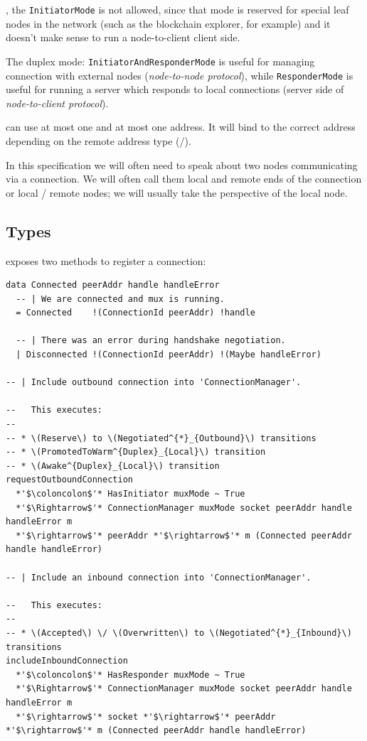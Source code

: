 \noindent, the \texttt{InitiatorMode} is not allowed, since that mode is reserved for
special leaf nodes in the network (such as the blockchain explorer, for example) and it doesn't make
sense to run a node-to-client client side.

The duplex mode: \texttt{InitiatorAndResponderMode} is useful for managing
connection with external nodes (\textit{node-to-node protocol}), while
\texttt{ResponderMode} is useful for running a server which responds to local
connections (server side of \textit{node-to-client protocol}).


\Connmngr{} can use at most one \ipvfour{} and at most one \ipvsix{}
address. It will bind to the correct address depending on the remote address
type (\ipvfour{}/\ipvsix{}).

In this specification we will often need to speak about two nodes communicating
via a \TCP{} connection.  We will often call them local and remote ends of the
connection or local \slash{} remote nodes; we will usually take the
perspective of the local node.


\subsection{Types} %

\Connmngr{} exposes two methods to register a connection:

\begin{lstlisting}
data Connected peerAddr handle handleError
  -- | We are connected and mux is running.
  = Connected    !(ConnectionId peerAddr) !handle

  -- | There was an error during handshake negotiation.
  | Disconnected !(ConnectionId peerAddr) !(Maybe handleError)

-- | Include outbound connection into 'ConnectionManager'.

--   This executes:
--
-- * \(Reserve\) to \(Negotiated^{*}_{Outbound}\) transitions
-- * \(PromotedToWarm^{Duplex}_{Local}\) transition
-- * \(Awake^{Duplex}_{Local}\) transition
requestOutboundConnection
  *'$\coloncolon$'* HasInitiator muxMode ~ True
  *'$\Rightarrow$'* ConnectionManager muxMode socket peerAddr handle handleError m
  *'$\rightarrow$'* peerAddr *'$\rightarrow$'* m (Connected peerAddr handle handleError)

-- | Include an inbound connection into 'ConnectionManager'.

--   This executes:
--
-- * \(Accepted\) \/ \(Overwritten\) to \(Negotiated^{*}_{Inbound}\) transitions
includeInboundConnection
  *'$\coloncolon$'* HasResponder muxMode ~ True
  *'$\Rightarrow$'* ConnectionManager muxMode socket peerAddr handle handleError m
  *'$\rightarrow$'* socket *'$\rightarrow$'* peerAddr *'$\rightarrow$'* m (Connected peerAddr handle handleError)
\end{lstlisting}

